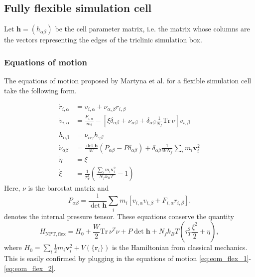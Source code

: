 \documentclass[12pt,letter]{article}
\renewcommand{\vec}[1]{\mathbf{#1}}
\begin{document}
\subsection{Fully flexible simulation cell}
Let $\mathbf{h} = (h_{\alpha\beta})$ be the cell parameter matrix, i.e. the matrix whose columns are the vectors
representing the edges of the triclinic simulation box. 

\subsubsection{Equations of motion}
The equations of motion proposed by Martyna et al. \cite{Martyna1994, Yu2010} for a flexible simulation cell take the following
form.

\begin{align}
\dot{r}_{i,\alpha} &= v_{i,\alpha} + \nu_{\alpha,\beta} r_{i,\beta} \label{eq:eom_flex_1}\\
\dot{v}_{i,\alpha} &= \frac{F_{i,\alpha}}{m_i} - \left[\xi \delta_{\alpha\beta}+ \nu_{\alpha\beta} + \delta_{\alpha\beta}\frac{1}{N_f} \mathrm{Tr}\,\nu \right] v_{i,\beta}\\
\dot{h}_{\alpha\beta} &= \nu_{\alpha\gamma} h_{\gamma\beta}\label{eq:heom}\\
\dot{\nu}_{\alpha\beta} &= \frac{\det \vec h}{W} (P_{\alpha\beta} - P \delta_{\alpha\beta}) + \delta_{\alpha\beta} \frac{1}{W N_f} \sum_i m_i \vec v_i^2\\
\dot \eta &= \xi\\
\dot \xi &= \frac{1}{\tau_T^2} \left(\frac{\sum_i m_i \vec v_i^2}{N_f k_B T} - 1\right)\label{eq:eom_flex_2}
\end{align}
Here, $\nu$ is the barostat matrix and
\begin{equation}
P_{\alpha\beta} = \frac{1}{\det \vec h} \sum_i m_i \left[ v_{i,\alpha} v_{i,\beta} + F_{i,\alpha} r_{i,\beta}\right].
\label{eq:pint}
\end{equation}
denotes the internal pressure tensor. These equations conserve the quantity
\begin{equation}
H_{\mathrm{NPT,flex}} = H_0 +  \frac{W}{2} \mathrm{Tr}\, \nu^T \nu + P \det \vec h+ N_f k_B T \left(\tau_T^2 \frac{\xi^2}{2} + \eta\right),
\label{eq:NPT_conserved_q}
\end{equation}
where $H_0=\sum_i \frac12 m_i \vec v_i^2 + V(\{\vec r_i\})$ is the Hamiltonian from classical mechanics.
This is easily confirmed by plugging in the equations of motion \eqref{eq:eom_flex_1}-\eqref{eq:eom_flex_2}.
\end{document}
